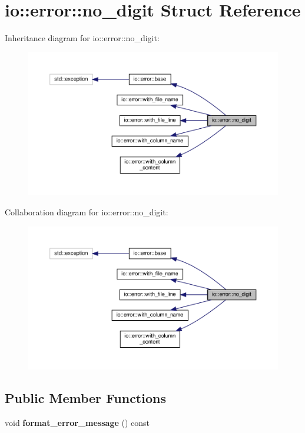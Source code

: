 \hypertarget{structio_1_1error_1_1no__digit}{}\section{io\+:\+:error\+:\+:no\+\_\+digit Struct Reference}
\label{structio_1_1error_1_1no__digit}


Inheritance diagram for io\+:\+:error\+:\+:no\+\_\+digit\+:\nopagebreak
\begin{figure}[H]
\begin{center}
\leavevmode
\includegraphics[width=350pt]{structio_1_1error_1_1no__digit__inherit__graph}
\end{center}
\end{figure}


Collaboration diagram for io\+:\+:error\+:\+:no\+\_\+digit\+:\nopagebreak
\begin{figure}[H]
\begin{center}
\leavevmode
\includegraphics[width=350pt]{structio_1_1error_1_1no__digit__coll__graph}
\end{center}
\end{figure}
\subsection*{Public Member Functions}
\begin{DoxyCompactItemize}
\item 
\mbox{\label{structio_1_1error_1_1no__digit_a469275c63f67171903f9cdb2418da5b3}} 
void {\bfseries format\+\_\+error\+\_\+message} () const
\end{DoxyCompactItemize}
